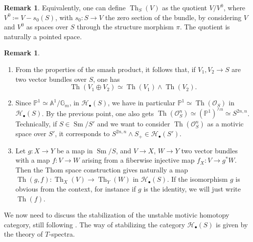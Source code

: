 \documentclass[10pt]{amsart}
\theoremstyle{definition}
\newtheorem{rmk}[defn]{Remark}
\theoremstyle{plain}
\numberwithin{equation}{section}
\newcommand{\0}{\emptyset}
\newcommand{\sH}{{\mathcal H}}
\newcommand{\A}{{\mathbb A}}
\newcommand{\G}{{\mathbb G}}
\renewcommand{\P}{{\mathbb P}}
\newcommand{\Th}{{\operatorname{Th}}}
\newcommand{\Sm}{{\operatorname{Sm}}}
\begin{document}
\begin{rmk}
    Equivalently, one can define $\Th_S(V)$ as the quotient $V/V^0$, where $V^0 \coloneqq V - s_0(S)$, with $s_0:S \to V$ the zero section of the bundle, by considering $V$ and $V^0$ as spaces over $S$ through the structure morphism $\pi$. The quotient is naturally a pointed space.
\end{rmk}

\begin{rmk}
\label{rmk:Thomspaces}
    \begin{enumerate}
        \item From the properties of the smash product, it follows that, if $V_1,V_2 \to S$ are two vector bundles over $S$, one has 
\begin{equation}
\label{eq:smash-thom}
    \Th(V_1 \oplus V_2) \simeq \Th(V_1) \wedge \Th(V_2).
\end{equation}
\item Since $\P^1 \simeq \A^1/\G_m$, in $\sH_{\bullet}(S)$, we have in particular $\P^1 \simeq \Th(\mathcal{O}_S)$ in $\sH_{\bullet}(S)$. By the previous point, one also gets $\Th(\mathcal{O}_S^n)\simeq (\P^1)^{\wedge n} \simeq S^{2n,n}$. Technically, if $S \in \Sm/S'$ and we want to consider $\Th(\mathcal{O}_S^n)$ as a motivic space over $S'$, it corresponds to $S^{2n,n}\wedge S_+ \in \sH_{\bullet}(S')$.
\item Let $g:X \to Y$ be a map in $\Sm/S$, and $V\to X$, $W \to Y$ two vector bundles with a map $f:V \to W$ arising from a fiberwise injective map $f_X:V\to g^*W$. Then the Thom space construction gives naturally a map $\Th(g,f):\Th_X(V) \to \Th_Y(W)$ in $\sH_{\bullet}(S)$. If the isomorphism $g$ is obvious from the context, for instance if $g$ is the identity, we will just write $\Th(f)$.
    \end{enumerate}
\end{rmk}

We now need to discuss the stabilization of the unstable motivic homotopy category, still following \cite{voe:homotopy_theory}. The way of stabilizing the category $\sH_{\bullet}(S)$ is given by the theory of $T$-spectra.
\end{document}
